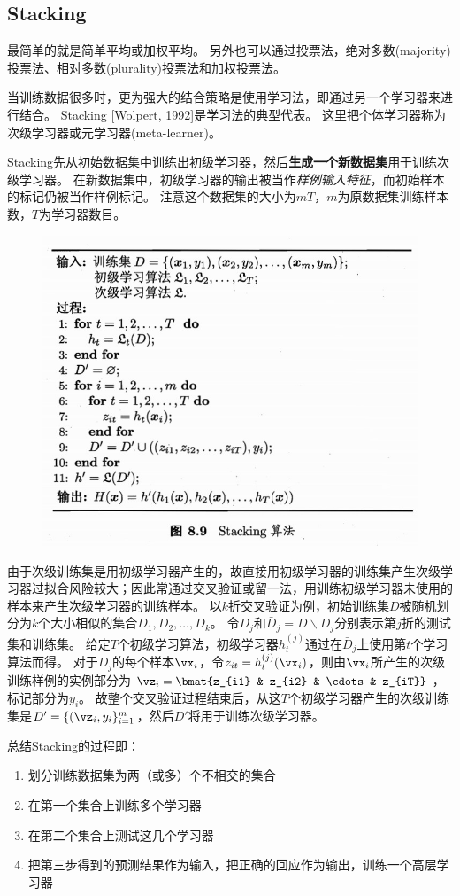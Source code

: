 \subsection{Stacking}
最简单的就是简单平均或加权平均。
另外也可以通过投票法，绝对多数(majority)投票法、相对多数(plurality)投票法和加权投票法。

当训练数据很多时，更为强大的结合策略是使用学习法，即通过另一个学习器来进行结合。
Stacking [Wolpert, 1992]是学习法的典型代表。
这里把个体学习器称为次级学习器或元学习器(meta-learner)。

Stacking先从初始数据集中训练出初级学习器，然后\textbf{生成一个新数据集}用于训练次级学习器。
在新数据集中，初级学习器的输出被当作\emph{样例输入特征}，而初始样本的标记仍被当作样例标记。
注意这个数据集的大小为$mT$，$m$为原数据集训练样本数，$T$为学习器数目。
\begin{figure}[H]
\centering
\includegraphics[width=0.6\linewidth]{fig/stacking.jpg}
\end{figure}

由于次级训练集是用初级学习器产生的，故直接用初级学习器的训练集产生次级学习器过拟合风险较大；因此常通过交叉验证或留一法，用训练初级学习器未使用的样本来产生次级学习器的训练样本。
以$k$折交叉验证为例，初始训练集$D$被随机划分为$k$个大小相似的集合$D_1,D_2,\ldots,D_k$。
令$D_j$和$\bar{D}_j=D\backslash D_j$分别表示第$j$折的测试集和训练集。
给定$T$个初级学习算法，初级学习器$h_t^{(j)}$通过在$\bar{D}_j$上使用第$t$个学习算法而得。
对于$D_j$的每个样本$\vx_i$，令$z_{it}=h_t^{(j)}(\vx_i)$，则由$\vx_i$所产生的次级训练样例的实例部分为$\vz_i=\bmat{z_{i1} & z_{i2} & \cdots & z_{iT}}$，标记部分为$y_i$。
故整个交叉验证过程结束后，从这$T$个初级学习器产生的次级训练集是$D'=\{(\vz_i,y_i\}_{i=1}^m$，然后$D'$将用于训练次级学习器。

总结Stacking的过程即：
\begin{enumerate}
\item 划分训练数据集为两（或多）个不相交的集合
\item 在第一个集合上训练多个学习器
\item 在第二个集合上测试这几个学习器
\item 把第三步得到的预测结果作为输入，把正确的回应作为输出，训练一个高层学习器
\end{enumerate}

